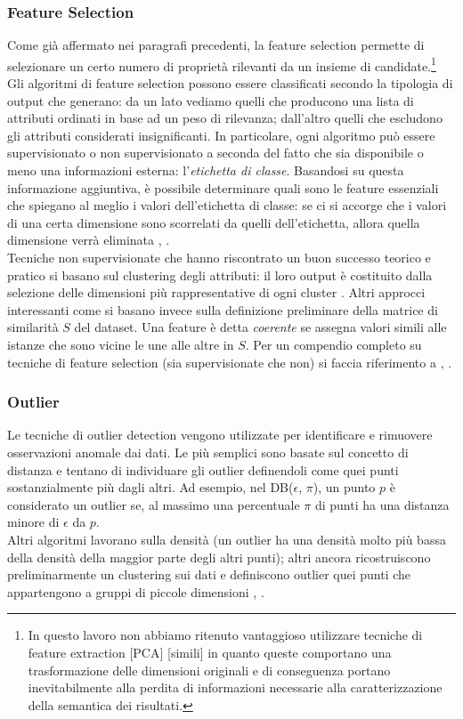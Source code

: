 \subsubsection{Feature Selection}
Come gi\`a affermato nei paragrafi precedenti, la feature selection permette di selezionare un certo numero di propriet\`a rilevanti da un insieme di candidate.\footnote{In questo lavoro non abbiamo ritenuto vantaggioso utilizzare tecniche di feature extraction [PCA] [simili] in quanto queste comportano una trasformazione delle dimensioni originali e di conseguenza portano inevitabilmente alla perdita di informazioni necessarie alla caratterizzazione della semantica dei risultati.}
Gli algoritmi di feature selection possono essere classificati secondo la tipologia di output che generano: da un lato vediamo quelli che producono una lista di attributi ordinati in base ad un peso di rilevanza; dall'altro quelli che escludono gli attributi considerati insignificanti. In particolare, ogni algoritmo pu\`o essere supervisionato o non supervisionato a seconda del fatto che sia disponibile o meno una informazioni esterna: l'\textit{etichetta di classe}. Basandosi su questa informazione aggiuntiva, \`e possibile determinare quali sono le feature essenziali che spiegano al meglio i valori dell'etichetta di classe: se ci si accorge che i valori di una certa dimensione sono scorrelati da quelli dell'etichetta, allora quella dimensione verr\`a eliminata \cite{hall1999}, \cite{Molina2002}.\\
Tecniche non supervisionate che hanno riscontrato un buon successo teorico e pratico si basano sul clustering degli attributi: il loro output \`e costituito dalla selezione delle dimensioni pi\`u rappresentative di ogni cluster \cite{Mitra2002}. Altri approcci interessanti come \cite{Zhao2007} si basano invece sulla definizione preliminare della matrice di similarit\`a $ S $ del dataset. Una feature \`e detta \textit{coerente} se assegna valori simili alle istanze che sono vicine le une alle altre in  $ S $.
Per un compendio completo su tecniche di feature selection (sia supervisionate che non) si faccia riferimento a \cite{Molina2002}, \cite{Chandrashekar2014}.

\subsubsection{Outlier}
\label{subsubsec:outlier}
Le tecniche di outlier detection vengono utilizzate per identificare e rimuovere osservazioni anomale dai dati.
Le pi\`u semplici sono basate sul concetto di distanza e tentano di individuare gli outlier definendoli come quei punti sostanzialmente pi\`u  dagli altri. Ad esempio, nel DB($\epsilon$, $\pi$), \cite{Knorr97} un punto $ p $ \`e considerato un outlier se, al massimo una percentuale $ \pi $ di punti ha una distanza minore di $\epsilon $ da $ p $.\\
Altri algoritmi lavorano sulla densit\`a \cite{Breunig2000,Breunig1999} (un outlier ha una densit\`a  molto pi\`u bassa della densit\`a della maggior parte degli altri punti); altri ancora ricostruiscono preliminarmente un clustering sui dati e definiscono outlier quei punti che appartengono a gruppi di piccole dimensioni \cite{Hodge2004}, \cite{Chandola07}.

